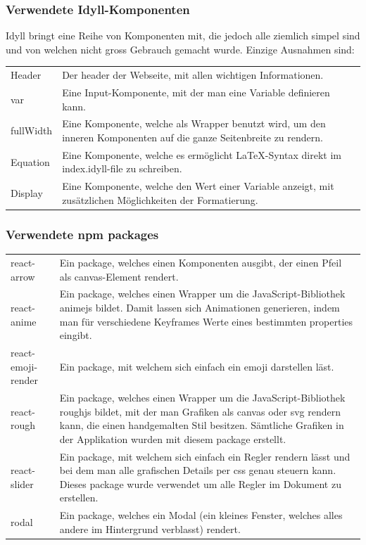 \documentclass[a4paper,10.2pt,pdftex]{scrartcl}%
\begin{document}
\subsubsection{Verwendete Idyll-Komponenten}
Idyll bringt eine Reihe von Komponenten mit, die jedoch alle ziemlich simpel sind und von welchen nicht gross Gebrauch gemacht wurde. Einzige Ausnahmen sind:

\begin{tabularx}{\textwidth}{p{2.5cm}p{11cm}}
Header & Der header der Webseite, mit allen wichtigen Informationen.\\
var & Eine Input-Komponente, mit der man eine Variable definieren kann. \\
fullWidth & Eine Komponente, welche als Wrapper benutzt wird, um den inneren Komponenten auf die ganze Seitenbreite zu rendern. \\
Equation & Eine Komponente, welche es ermöglicht LaTeX-Syntax direkt im index.idyll-file zu schreiben. \\
Display & Eine Komponente, welche den Wert einer Variable anzeigt, mit zusätzlichen Möglichkeiten der Formatierung.
\end{tabularx}

\subsubsection{Verwendete npm packages}
\begin{tabularx}{\textwidth}{p{3cm}p{11cm}}
react-arrow &  Ein package, welches einen Komponenten ausgibt, der einen Pfeil als canvas-Element rendert. \\
react-anime &  Ein package, welches einen Wrapper um die JavaScript-Bibliothek animejs bildet. Damit lassen sich Animationen generieren, indem man für verschiedene Keyframes Werte eines bestimmten properties eingibt. \\
react-emoji-render &  Ein package, mit welchem sich einfach ein emoji darstellen läst. \\
react-rough &  Ein package, welches einen Wrapper um die JavaScript-Bibliothek roughjs bildet, mit der man Grafiken als canvas oder svg rendern kann, die einen handgemalten Stil besitzen. Sämtliche Grafiken in der Applikation wurden mit diesem package erstellt. \\
react-slider&  Ein package, mit welchem sich einfach ein Regler rendern lässt und bei dem man alle grafischen  Details per css genau steuern kann. Dieses package wurde verwendet um alle Regler im Dokument zu erstellen. \\
rodal&  Ein package, welches ein Modal (ein kleines Fenster, welches alles andere im Hintergrund verblasst)  rendert.

\end{tabularx}
\end{document}
